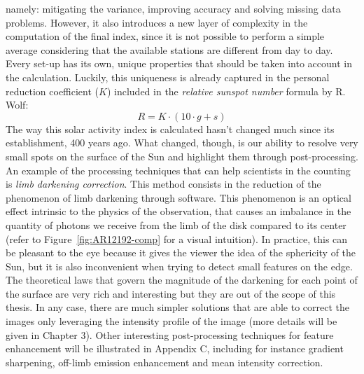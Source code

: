 namely: mitigating the variance, improving accuracy and solving missing data problems. However, it also introduces a new layer of complexity in the computation of the final index, since it is not possible to perform a simple average considering that the available stations are different from day to day. Every set-up has its own, unique properties that should be taken into account in the calculation. Luckily, this uniqueness is already captured in the personal reduction coefficient ($K$) included in the \textit{relative sunspot number} formula by R. Wolf:
\begin{equation}\label{relssnum}
R = K \cdot (10 \cdot g + s)
\end{equation}
The way this solar activity index is calculated hasn't changed much since its establishment, 400 years ago. What changed, though, is our ability to resolve very small spots on the surface of the Sun and highlight them through post-processing. \\
An example of the processing techniques that can help scientists in the counting is \textit{limb darkening correction}. This method consists in the reduction of the phenomenon of limb darkening through software. This phenomenon is an optical effect intrinsic to the physics of the observation, that causes an imbalance in the quantity of photons we receive from the limb of the disk compared to its center (refer to Figure~\ref{fig:AR12192-comp} for a visual intuition). In practice, this can be pleasant to the eye because it gives the viewer the idea of the sphericity of the Sun, but it is also inconvenient when trying to detect small features on the edge. The theoretical laws that govern the magnitude of the darkening for each point of the surface are very rich and interesting but they are out of the scope of this thesis. In any case, there are much simpler solutions that are able to correct the images only leveraging the intensity profile of the image (more details will be given in Chapter 3). Other interesting post-processing techniques for feature enhancement will be illustrated in Appendix C, including for instance gradient sharpening, off-limb emission enhancement and mean intensity correction. \\
